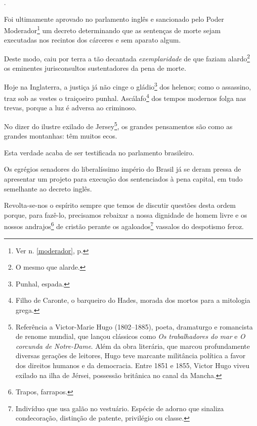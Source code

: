 


.

Foi ultimamente aprovado no parlamento inglês e sancionado pelo Poder
Moderador\footnote{Ver n. \ref{moderador}, p. \pageref{moderador}} 
um decreto determinando que as sentenças de morte sejam executadas nos 
recintos dos cárceres e sem aparato algum.

Deste modo, caiu por terra a tão decantada \emph{exemplaridade} de que
faziam alardo\footnote{O mesmo que alarde.} os eminentes
jurisconsultos sustentadores da pena de morte.

Hoje na Inglaterra, a justiça já não cinge o gládio\footnote{Punhal,
  espada.} dos helenos; como o assassino, traz sob as vestes o
traiçoeiro punhal. Ascálafo\footnote{Filho de Caronte, o barqueiro do
  Hades, morada dos mortos para a mitologia grega.} dos tempos modernos
folga nas trevas, porque a luz é adversa ao criminoso.

No dizer do ilustre exilado de Jersey\footnote{Referência a
  Victor-Marie Hugo (1802--1885), poeta, dramaturgo e romancista de
  renome mundial, que lançou clássicos como \emph{Os trabalhadores do
  mar} e \emph{O corcunda de Notre-Dame}. Além da obra literária, que
  marcou profundamente diversas gerações de leitores, Hugo teve marcante
  militância política a favor dos direitos humanos e da democracia.
  Entre 1851 e 1855, Victor Hugo viveu exilado na ilha de Jérsei,
  possessão britânica no canal da Mancha.}, os grandes pensamentos são
como as grandes montanhas: têm muitos ecos.

Esta verdade acaba de ser testificada no parlamento brasileiro.

Os egrégios senadores do liberalíssimo império do Brasil já se deram
pressa de apresentar um projeto para execução dos sentenciados à pena
capital, em tudo semelhante ao decreto inglês.

Revolta-se-nos o espírito sempre que temos de discutir questões desta
ordem porque, para fazê-lo, precisamos rebaixar a nossa dignidade de
homem livre e os nossos andrajos\footnote{Trapos, farrapos.} de
cristão perante os agaloados\footnote{Indivíduo que usa galão no
  vestuário. Espécie de adorno que sinaliza condecoração, distinção de
  patente, privilégio ou classe.} vassalos do despotismo feroz.

